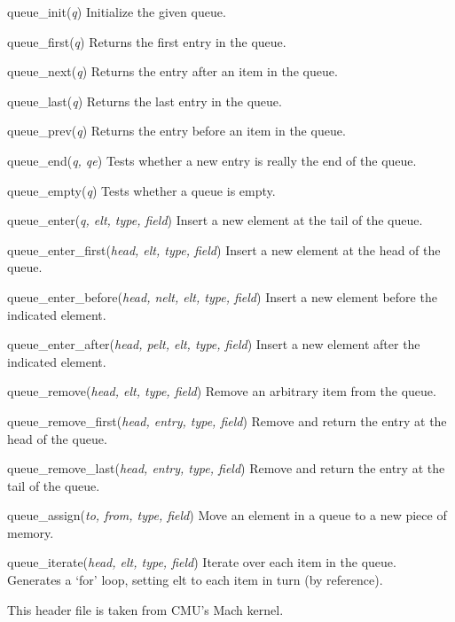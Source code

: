 \begin{apidesc}
	\begin{csymlist}
	\item[queue_init(\emph{q})]	
		Initialize the given queue.
	\item[queue_first(\emph{q})]	
		Returns the first entry in the queue.
	\item[queue_next(\emph{q})]	
		Returns the entry after an item in the queue.
	\item[queue_last(\emph{q})]	
		Returns the last entry in the queue.
	\item[queue_prev(\emph{q})]	
		Returns the entry before an item in the queue.
	\item[queue_end(\emph{q, qe})]	
		Tests whether a new entry is really the end of the queue.
	\item[queue_empty(\emph{q})]	
		Tests whether a queue is empty.
	\item[queue_enter(\emph{q, elt, type, field})]	
		Insert a new element at the tail of the queue.
	\item[queue_enter_first(\emph{head, elt, type, field})]
		Insert a new element at the head of the queue.
	\item[queue_enter_before(\emph{head, nelt, elt, type, field})]
		Insert a new element before the indicated element.
	\item[queue_enter_after(\emph{head, pelt, elt, type, field})]
		Insert a new element after the indicated element.
	\item[queue_remove(\emph{head, elt, type, field})]
		Remove an arbitrary item from the queue.
	\item[queue_remove_first(\emph{head, entry, type, field})]
		Remove and return the entry at the head of the queue.
	\item[queue_remove_last(\emph{head, entry, type, field})]
		Remove and return the entry at the tail of the queue.
	\item[queue_assign(\emph{to, from, type, field})]
		Move an element in a queue to a new piece of memory.
	\item[queue_iterate(\emph{head, elt, type, field})]
		Iterate over each item in the queue.  Generates a
		`for' loop, setting elt to each item in turn (by
		reference).
	\end{csymlist}

	This header file is taken from CMU's Mach kernel.
\end{apidesc}


